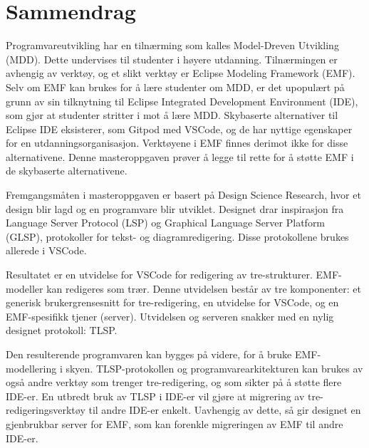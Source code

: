 \chapter*{Sammendrag}

Programvareutvikling har en tilnærming som kalles Model-Dreven Utvikling (MDD).
Dette undervises til studenter i høyere utdanning.
Tilnærmingen er avhengig av verktøy, og et slikt verktøy er Eclipse Modeling Framework (EMF).
Selv om EMF kan brukes for å lære studenter om MDD, er det upopulært på grunn av sin tilknytning til Eclipse Integrated Development Environment (IDE), som gjør at studenter stritter i mot å lære MDD.
Skybaserte alternativer til Eclipse IDE eksisterer, som Gitpod med VSCode, og de har nyttige egenskaper for en utdanningsorganisasjon.
Verktøyene i EMF finnes derimot ikke for disse alternativene.
Denne masteroppgaven prøver å legge til rette for å støtte EMF i de skybaserte alternativene.

Fremgangsmåten i masteroppgaven er basert på Design Science Research, hvor et design blir lagd og en programvare blir utviklet.
Designet drar inspirasjon fra Language Server Protocol (LSP) og Graphical Language Server Platform (GLSP), protokoller for tekst- og diagramredigering.
Disse protokollene brukes allerede i VSCode.

Resultatet er en utvidelse for VSCode for redigering av tre-strukturer.
EMF-modeller kan redigeres som trær.
Denne utvidelsen består av tre komponenter: et generisk brukergrensesnitt for tre-redigering, en utvidelse for VSCode, og en EMF-spesifikk tjener (server).
Utvidelsen og serveren snakker med en nylig designet protokoll: \acrfull{TLSP}.

Den resulterende programvaren kan bygges på videre, for å bruke EMF-modellering i skyen.
TLSP-protokollen og programvarearkitekturen kan brukes av også andre verktøy som trenger tre-redigering, og som sikter på å støtte flere IDE-er.
En utbredt bruk av TLSP i IDE-er vil gjøre at migrering av tre-redigeringsverktøy til andre IDE-er enkelt.
Uavhengig av dette, så gir designet en gjenbrukbar server for EMF, som kan forenkle migreringen av EMF til andre IDE-er.